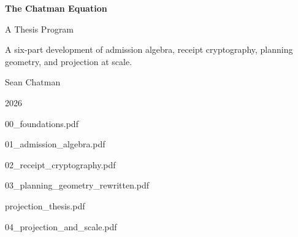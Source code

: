 \documentclass[11pt]{article}
\begin{document}
\begin{titlepage}
  \centering
  \vspace*{4cm}
  {\Huge\bfseries The Chatman Equation\par}
  \vspace{0.8cm}
  {\LARGE A Thesis Program\par}
  \vspace{2.5cm}
  {\large A six-part development of admission algebra, receipt
   cryptography, planning geometry, and projection at scale.\par}
  \vfill
  {\large Sean Chatman\par}
  \vspace{0.5cm}
  {\large 2026\par}
\end{titlepage}

\thispagestyle{empty}
\tableofcontents
\clearpage

%
  {00_foundations.pdf}

%
  {01_admission_algebra.pdf}

%
  {02_receipt_cryptography.pdf}

%
  {03_planning_geometry_rewritten.pdf}

%
  {projection_thesis.pdf}

%
  {04_projection_and_scale.pdf}
\end{document}
